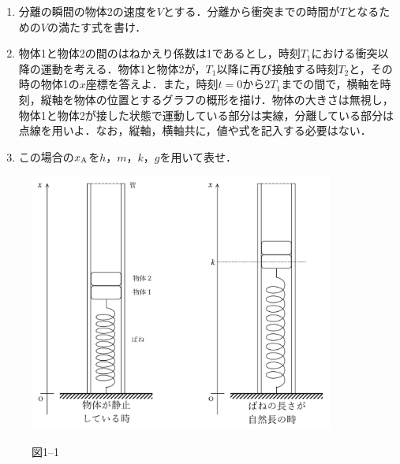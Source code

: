 \begin{enumerate}[I]
\begin{enumerate}[(1)]
    \item {\hzw}分離の瞬間の物体2の速度を$V$とする．分離から衝突までの時間が$T$となるための$V$の満たす式を書け．
    \item {\hzw}物体1と物体2の間のはねかえり係数は1であるとし，時刻$T_1$における衝突以降の運動を考える．物体1と物体2が，$T_1$以降に再び接触する時刻$T_2$と，その時の物体1の$x$座標を答えよ．また，時刻$t=0$から$2T_1$までの間で，横軸を時刻，縦軸を物体の位置とするグラフの概形を描け．物体の大きさは無視し，物体1と物体2が接した状態で運動している部分は実線，分離している部分は点線を用いよ．なお，縦軸，横軸共に，値や式を記入する必要はない．
    \item {\hzw}この場合の$x_\mathrm{A}$を$h$，$m$，$k$，$g$を用いて表せ．
  \end{enumerate}
\end{enumerate}

\begin{figure}[H]
  \centering
  \includegraphics[width=10cm]{fig/fig_1_9_1.pdf}

  図1--1
\end{figure}

